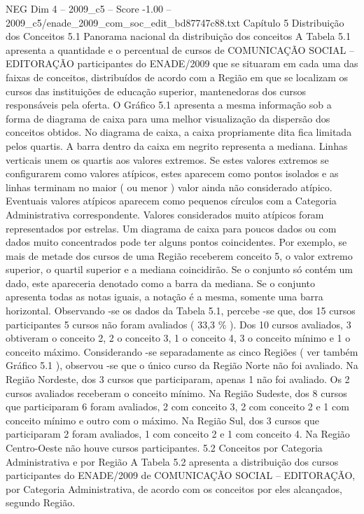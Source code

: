 \begin{textsample}{NEG Dim 4 – 2009\_c5 – Score -1.00 – 2009\_c5/enade\_2009\_com\_soc\_edit\_bd87747c88.txt}  \label{ex:f4_neg_090}
Capítulo 5 Distribuição dos Conceitos 5.1 Panorama nacional da distribuição dos conceitos A Tabela 5.1 apresenta a quantidade e o percentual de cursos de COMUNICAÇÃO SOCIAL – EDITORAÇÃO participantes do ENADE/2009 que se situaram em cada uma das faixas de conceitos, distribuídos de acordo com a Região em que se localizam os cursos das instituições de educação superior, mantenedoras dos cursos responsáveis pela oferta.
O Gráfico 5.1 apresenta a mesma informação sob a forma de diagrama de caixa para uma melhor visualização da dispersão dos conceitos obtidos.
No diagrama de caixa, a caixa propriamente dita fica limitada pelos quartis.
A barra dentro da caixa em negrito representa a mediana.
Linhas verticais unem os quartis aos valores extremos.
Se estes valores extremos se configurarem como valores atípicos, estes aparecem como pontos isolados e as linhas terminam no maior ( ou menor ) valor ainda não considerado atípico.
Eventuais valores atípicos aparecem como pequenos círculos com a Categoria Administrativa correspondente.
Valores considerados muito atípicos foram representados por estrelas.
Um diagrama de caixa para poucos dados ou com dados muito concentrados pode ter alguns pontos coincidentes.
Por exemplo, se mais de metade dos cursos de uma Região receberem conceito 5, o valor extremo superior, o quartil superior e a mediana coincidirão.
Se o conjunto só contém um dado, este apareceria denotado como a barra da mediana.
Se o conjunto apresenta todas as notas iguais, a notação é a mesma, somente uma barra horizontal.
Observando -se os dados da Tabela 5.1, percebe -se que, dos 15 cursos participantes 5 cursos não foram avaliados ( 33,3 \% ).
Dos 10 cursos avaliados, 3 obtiveram o conceito 2, 2 o conceito 3, 1 o conceito 4, 3 o conceito mínimo e 1 o conceito máximo.
Considerando -se separadamente as cinco Regiões ( ver também Gráfico 5.1 ), observou -se que o único curso da Região Norte não foi avaliado.
Na Região Nordeste, dos 3 cursos que participaram, apenas 1 não foi avaliado.
Os 2 cursos avaliados receberam o conceito mínimo.
Na Região Sudeste, dos 8 cursos que participaram 6 foram avaliados, 2 com conceito 3, 2 com conceito 2 e 1 com conceito mínimo e outro com o máximo.
Na Região Sul, dos 3 cursos que participaram 2 foram avaliados, 1 com conceito 2 e 1 com conceito 4.
Na Região Centro-Oeste não houve cursos participantes. 5.2 Conceitos por Categoria Administrativa e por Região A Tabela 5.2 apresenta a distribuição dos cursos participantes do ENADE/2009 de COMUNICAÇÃO SOCIAL – EDITORAÇÃO, por Categoria Administrativa, de acordo com os conceitos por eles alcançados, segundo Região.

\end{textsample}
